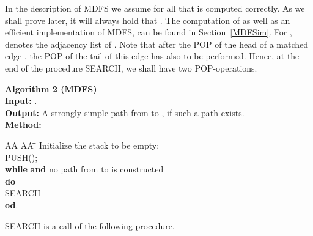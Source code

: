 \documentclass[12pt,twoside,a4paper]{article}
\begin{document}
\medskip
In the description of MDFS we assume for all  that
 is computed correctly. As we shall prove later, it will always hold
that .
The computation of  as well
as an efficient implementation of MDFS, can be found in Section~\ref{MDFSim}.
For ,  denotes the adjacency list of .
Note that after the POP of the head  of a matched edge ,
the POP of the tail  of this edge has also to be performed. Hence, at the
end of the procedure SEARCH, we shall have two POP-operations.

\medskip
\noindent
{\bf Algorithm 2 (MDFS)} \\
{\bf Input:} . \\
{\bf Output:} A strongly simple path  from  to , if such a path exists.\\
{\bf Method:}
\vspace{-0.3cm}
\begin{tabbing}
AA \= AA \= \= \kill
Initialize the stack  to be empty; \\
PUSH(); \\
{\bf while}  {\bf and} no path from  to  is constructed \\
\> {\bf do} \\
\> \> SEARCH \\
\> {\bf od}.
\end{tabbing}
\noindent
SEARCH is a call of the following procedure. 
\end{document}
